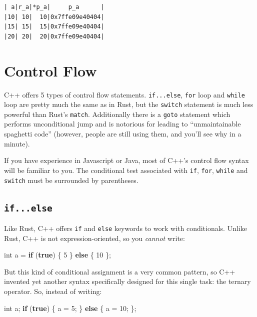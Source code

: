 \documentclass[
]{book}
\newenvironment{Shaded}{\begin{snugshade}}{\end{snugshade}}
\newcommand{\ControlFlowTok}[1]{\textcolor[rgb]{0.13,0.29,0.53}{\textbf{#1}}}
\newcommand{\DataTypeTok}[1]{\textcolor[rgb]{0.13,0.29,0.53}{#1}}
\newcommand{\DecValTok}[1]{\textcolor[rgb]{0.00,0.00,0.81}{#1}}
\newcommand{\KeywordTok}[1]{\textcolor[rgb]{0.13,0.29,0.53}{\textbf{#1}}}
\newcommand{\NormalTok}[1]{#1}
\begin{document}
\begin{verbatim}
| a|r_a|*p_a|     p_a      |
|10| 10|  10|0x7ffe09e40404|
|15| 15|  15|0x7ffe09e40404|
|20| 20|  20|0x7ffe09e40404|
\end{verbatim}

\hypertarget{control-flow}{%
\section{Control Flow}\label{control-flow}}

C++ offers 5 types of control flow statements. \texttt{if...else}, \texttt{for} loop and \texttt{while} loop are pretty much the same as in Rust, but the \texttt{switch} statement is much less powerful than Rust's \texttt{match}. Additionally there is a \texttt{goto} statement which performs unconditional jump and is notorious for leading to ``unmaintainable spaghetti code'' (however, people are still using them, and you'll see why in a minute).

If you have experience in Javascript or Java, most of C++'s control flow syntax will be familiar to you. The conditional test associated with \texttt{if}, \texttt{for}, \texttt{while} and \texttt{switch} must be surrounded by parentheses.

\hypertarget{if...else}{%
\subsection{\texorpdfstring{\texttt{if...else}}{if...else}}\label{if...else}}

Like Rust, C++ offers \texttt{if} and \texttt{else} keywords to work with conditionals. Unlike Rust, C++ is not expression-oriented, so you \emph{cannot} write:

\begin{Shaded}
\begin{Highlighting}[]
\DataTypeTok{int}\NormalTok{ a = }\ControlFlowTok{if}\NormalTok{ (}\KeywordTok{true}\NormalTok{) \{ }\DecValTok{5}\NormalTok{ \} }\ControlFlowTok{else}\NormalTok{ \{ }\DecValTok{10}\NormalTok{ \};}
\end{Highlighting}
\end{Shaded}

But this kind of conditional assignment is a very common pattern, so C++ invented yet another syntax specifically designed for this single task: the ternary operator. So, instead of writing:

\begin{Shaded}
\begin{Highlighting}[]
\DataTypeTok{int}\NormalTok{ a;}
\ControlFlowTok{if}\NormalTok{ (}\KeywordTok{true}\NormalTok{) \{ a = }\DecValTok{5}\NormalTok{; \} }\ControlFlowTok{else}\NormalTok{ \{ a = }\DecValTok{10}\NormalTok{; \};}
\end{Highlighting}
\end{Shaded}
\end{document}

